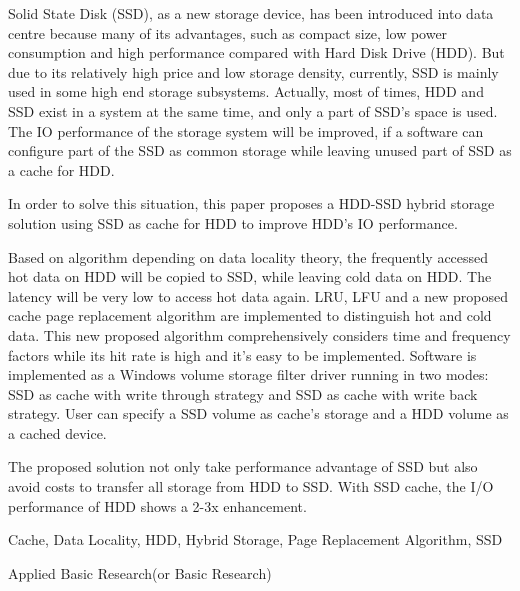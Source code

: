 \begin{eabstract}

Solid State Disk (SSD), as a new storage device, has been introduced into data centre because many of its advantages, such as compact size, low power consumption and high performance compared with Hard Disk Drive (HDD). But due to its relatively high price and low storage density, currently, SSD is mainly used in some high end storage subsystems. Actually, most of times, HDD and SSD exist in a system at the same time, and only a part of SSD's space is used. The IO performance of the storage system will be improved, if a software can configure part of the SSD as common storage while leaving unused part of SSD as a cache for HDD.

In order to solve this situation, this paper proposes a HDD-SSD hybrid storage solution using SSD as cache for HDD to improve HDD's IO performance.

Based on algorithm depending on data locality theory, the frequently accessed hot data on HDD will be copied to SSD, while leaving cold data on HDD. The latency will be very low to access hot data again. LRU, LFU and a new proposed cache page replacement algorithm are implemented to distinguish hot and cold data. This new proposed algorithm comprehensively considers time and frequency factors while its hit rate is high and it's easy to be implemented. Software is implemented as a Windows volume storage filter driver running in two modes: SSD as cache with write through strategy and SSD as cache with write back strategy. User can specify a SSD volume as cache's storage and a HDD volume as a cached device.

The proposed solution not only take performance advantage of SSD but also avoid costs to transfer all storage from HDD to SSD. With SSD cache, the I/O performance of HDD shows a 2-3x enhancement.

\end{eabstract}

\begin{ekeywords}
Cache, Data Locality, HDD, Hybrid Storage, Page Replacement Algorithm, SSD
\end{ekeywords}

\begin{ethesistype}
Applied Basic Research(or Basic Research)
\end{ethesistype}

